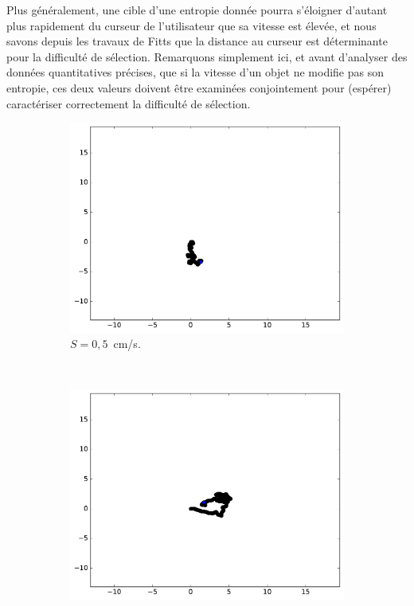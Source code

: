 	Plus généralement, une cible d'une entropie donnée pourra s'éloigner d'autant plus rapidement du curseur de l'utilisateur que sa vitesse est élevée, et nous savons depuis les travaux de Fitts que la distance au curseur est déterminante pour la difficulté de sélection. Remarquons simplement ici, et avant d'analyser des données quantitatives précises, que si la vitesse d'un objet ne modifie pas son entropie, ces deux valeurs doivent être examinées conjointement pour (espérer) caractériser correctement la difficulté de sélection.	

	\begin{figure}[htb]
		\centering
		\begin{subfigure}[t]{\subImgWarea}
			\centering
			\includegraphics[width=\textwidth]{figures/ch3/spTraj_0_5_120_2}
			\caption[$S = 0,5$]{$S = 0,5$~cm/s.}
			\label{fig:spTraj_0_5_120_2}
		\end{subfigure}
		~
		\begin{subfigure}[t]{\subImgWarea}
			\centering
			\includegraphics[width=\textwidth]{figures/ch3/spTraj_1_0_120_2}

\end{subfigure}
\end{figure}
